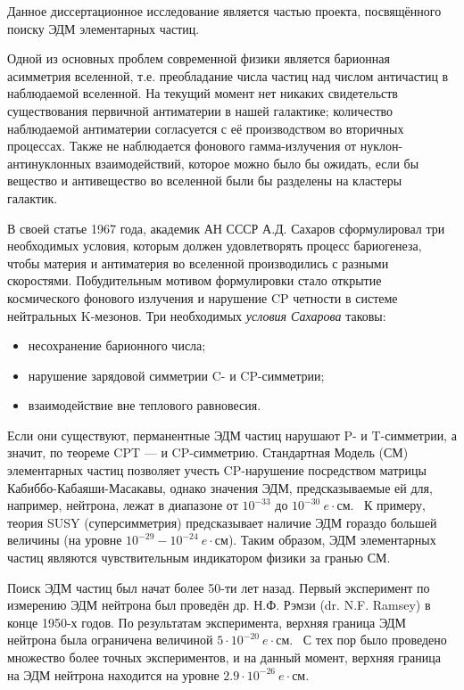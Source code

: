 
{\actuality} 
Данное диссертационное исследование является частью проекта, посвящённого поиску ЭДМ элементарных частиц.

Одной из основных проблем современной физики является барионная асимметрия вселенной, т.е. преобладание числа частиц над числом античастиц в наблюдаемой вселенной. На текущий момент нет никаких свидетельств существования первичной антиматерии в нашей галактике; количество наблюдаемой антиматерии согласуется с её производством во вторичных процессах. Также не наблюдается фонового гамма-излучения от нуклон-антинуклонных взаимодействий, которое можно было бы ожидать, если бы вещество и антивещество во вселенной были бы разделены на кластеры галактик.~\cite{Trodden:Baryogenesis}

В своей статье 1967 года, академик АН СССР А.Д. Сахаров сформулировал три необходимых условия, которым должен удовлетворять процесс бариогенеза, чтобы материя и антиматерия во вселенной производились с разными скоростями. Побудительным мотивом формулировки стало открытие космического фонового излучения и нарушение CP четности в системе нейтральных K-мезонов. Три необходимых \emph{условия Сахарова} таковы:
\begin{itemize}
	\item несохранение барионного числа;
	\item нарушение зарядовой симметрии C- и CP-симметрии;
	\item взаимодействие вне теплового равновесия.
\end{itemize}

Если они существуют, перманентные ЭДМ частиц нарушают P- и T-симметрии, а значит, по теореме CPT --- и CP-симметрию. Стандартная Модель (СМ) элементарных частиц позволяет учесть CP-нарушение посредством матрицы Кабиббо-Кабаяши-Масакавы, однако значения ЭДМ, предсказываемые ей для, например, нейтрона, лежат в диапазоне от $10^{-33}$ до $10^{-30}~e\cdot$см.~\cite{Harris:Neutron2007} К примеру, теория SUSY (суперсимметрия) предсказывает наличие ЭДМ гораздо большей величины (на уровне $10^{-29} - 10^{-24}~e\cdot$см). Таким образом, ЭДМ элементарных частиц являются чувствительным индикатором физики за гранью СМ. 

Поиск ЭДМ частиц был начат более 50-ти лет назад. Первый эксперимент по измерению ЭДМ нейтрона был проведён др. Н.Ф. Рэмзи (dr. N.F. Ramsey) в конце 1950-х годов. По результатам эксперимента, верхняя граница ЭДМ нейтрона была ограничена величиной $5\cdot 10^{-20}~e\cdot$см.~\cite{Ramsey:Neutron1957} С тех пор было проведено множество более точных экспериментов, и на данный момент, верхняя граница на ЭДМ нейтрона находится на уровне $2.9\cdot 10^{-26}~e\cdot$см.

